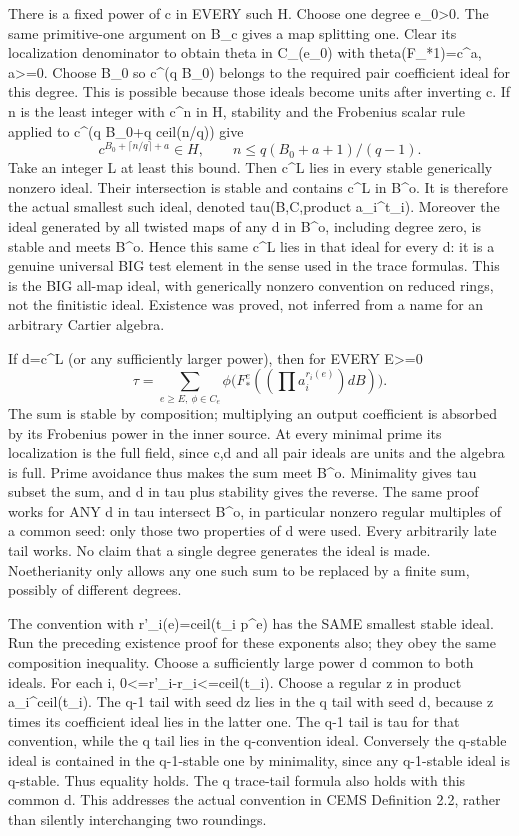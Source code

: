 \documentclass[11pt]{article}
\begin{document}
There is a fixed power of c in EVERY such H. Choose one degree e\_0>0. The same primitive-one argument on B\_c gives a map splitting one. Clear its localization denominator to obtain theta in C\_(e\_0) with theta(F\_*1)=c\textasciicircum{}a, a>=0. Choose B\_0 so c\textasciicircum{}(q B\_0) belongs to the required pair coefficient ideal for this degree. This is possible because those ideals become units after inverting c. If n is the least integer with c\textasciicircum{}n in H, stability and the Frobenius scalar rule applied to c\textasciicircum{}(q B\_0+q ceil(n/q)) give
\[
c^{B_0+\lceil n/q\rceil+a}\in H,
\qquad n\le q(B_0+a+1)/(q-1).
\]
Take an integer L at least this bound. Then c\textasciicircum{}L lies in every stable generically nonzero ideal. Their intersection is stable and contains c\textasciicircum{}L in B\textasciicircum{}o. It is therefore the actual smallest such ideal, denoted tau(B,C,product a\_i\textasciicircum{}t\_i). Moreover the ideal generated by all twisted maps of any d in B\textasciicircum{}o, including degree zero, is stable and meets B\textasciicircum{}o. Hence this same c\textasciicircum{}L lies in that ideal for every d: it is a genuine universal BIG test element in the sense used in the trace formulas. This is the BIG all-map ideal, with generically nonzero convention on reduced rings, not the finitistic ideal. Existence was proved, not inferred from a name for an arbitrary Cartier algebra.

If d=c\textasciicircum{}L (or any sufficiently larger power), then for EVERY E>=0
\[
\tau=\sum_{e\ge E,\ \phi\in C_e}
\phi\big(F_*^e((\prod a_i^{r_i(e)})dB)\big).
\]
The sum is stable by composition; multiplying an output coefficient is absorbed by its Frobenius power in the inner source. At every minimal prime its localization is the full field, since c,d and all pair ideals are units and the algebra is full. Prime avoidance thus makes the sum meet B\textasciicircum{}o. Minimality gives tau subset the sum, and d in tau plus stability gives the reverse. The same proof works for ANY d in tau intersect B\textasciicircum{}o, in particular nonzero regular multiples of a common seed: only those two properties of d were used. Every arbitrarily late tail works. No claim that a single degree generates the ideal is made. Noetherianity only allows any one such sum to be replaced by a finite sum, possibly of different degrees.

The convention with r'\_i(e)=ceil(t\_i p\textasciicircum{}e) has the SAME smallest stable ideal. Run the preceding existence proof for these exponents also; they obey the same composition inequality. Choose a sufficiently large power d common to both ideals. For each i, 0<=r'\_i-r\_i<=ceil(t\_i). Choose a regular z in product a\_i\textasciicircum{}ceil(t\_i). The q-1 tail with seed dz lies in the q tail with seed d, because z times its coefficient ideal lies in the latter one. The q-1 tail is tau for that convention, while the q tail lies in the q-convention ideal. Conversely the q-stable ideal is contained in the q-1-stable one by minimality, since any q-1-stable ideal is q-stable. Thus equality holds. The q trace-tail formula also holds with this common d. This addresses the actual convention in CEMS Definition 2.2, rather than silently interchanging two roundings.
\end{document}
